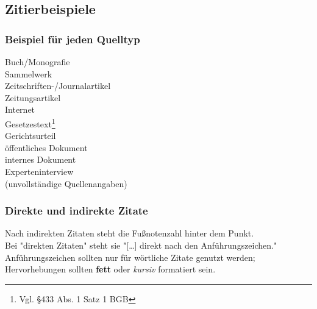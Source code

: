 \newpage
\subsection{Zitierbeispiele}
\subsubsection{Beispiel für jeden Quelltyp}

Buch/Monografie\\
Sammelwerk\\
Zeitschriften-/Journalartikel\\
Zeitungsartikel\\
Internet\\
Gesetzestext\footnote{Vgl. §433 Abs. 1 Satz 1 BGB}\nocite{bgb}\\
Gerichtsurteil\\
öffentliches Dokument\\
internes Dokument\\%
Experteninterview\\
(unvollständige Quellenangaben)

\newpage
\subsubsection{Direkte und indirekte Zitate}

Nach indirekten Zitaten steht die Fußnotenzahl hinter dem Punkt.\\%
Bei "direkten Zitaten" steht sie "[\ldots] direkt nach den Anführungszeichen."\\%
Anführungszeichen sollten nur für wörtliche Zitate genutzt werden; Hervorhebungen sollten \textbf{fett} oder \textit{kursiv} formatiert sein.

